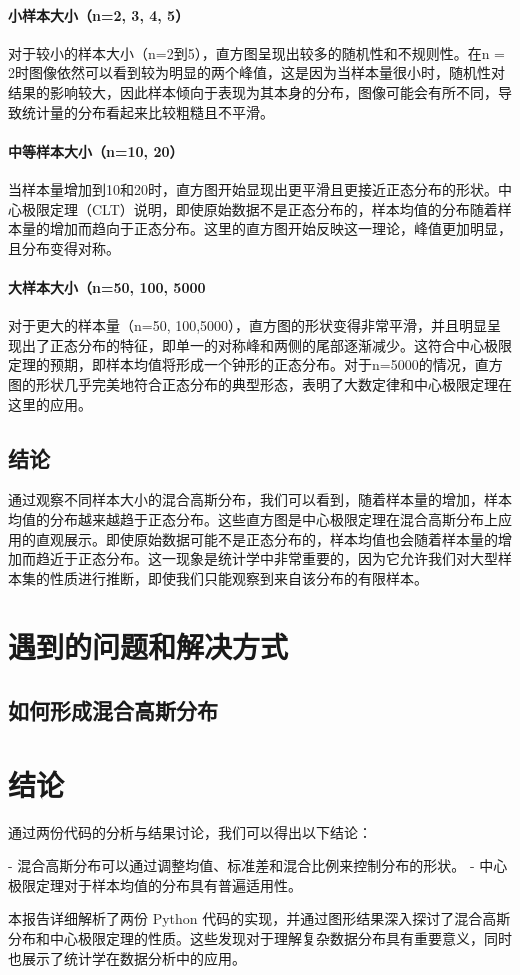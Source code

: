 \documentclass[a4paper]{article}
\begin{document}
\paragraph{小样本大小（n=2, 3, 4, 5）}
对于较小的样本大小（n=2到5），直方图呈现出较多的随机性和不规则性。在n = 2时图像依然可以看到较为明显的两个峰值，这是因为当样本量很小时，随机性对结果的影响较大，因此样本倾向于表现为其本身的分布，图像可能会有所不同，导致统计量的分布看起来比较粗糙且不平滑。

\paragraph{中等样本大小（n=10, 20）}
当样本量增加到10和20时，直方图开始显现出更平滑且更接近正态分布的形状。中心极限定理（CLT）说明，即使原始数据不是正态分布的，样本均值的分布随着样本量的增加而趋向于正态分布。这里的直方图开始反映这一理论，峰值更加明显，且分布变得对称。

\paragraph{大样本大小（n=50, 100, 5000}
对于更大的样本量（n=50, 100,5000），直方图的形状变得非常平滑，并且明显呈现出了正态分布的特征，即单一的对称峰和两侧的尾部逐渐减少。这符合中心极限定理的预期，即样本均值将形成一个钟形的正态分布。对于n=5000的情况，直方图的形状几乎完美地符合正态分布的典型形态，表明了大数定律和中心极限定理在这里的应用。

\subsection{结论}
通过观察不同样本大小的混合高斯分布，我们可以看到，随着样本量的增加，样本均值的分布越来越趋于正态分布。这些直方图是中心极限定理在混合高斯分布上应用的直观展示。即使原始数据可能不是正态分布的，样本均值也会随着样本量的增加而趋近于正态分布。这一现象是统计学中非常重要的，因为它允许我们对大型样本集的性质进行推断，即使我们只能观察到来自该分布的有限样本。

\section{遇到的问题和解决方式}
\subsection{如何形成混合高斯分布}

\section{结论}

通过两份代码的分析与结果讨论，我们可以得出以下结论：

- 混合高斯分布可以通过调整均值、标准差和混合比例来控制分布的形状。
- 中心极限定理对于样本均值的分布具有普遍适用性。

本报告详细解析了两份 Python 代码的实现，并通过图形结果深入探讨了混合高斯分布和中心极限定理的性质。这些发现对于理解复杂数据分布具有重要意义，同时也展示了统计学在数据分析中的应用。
\end{document}

